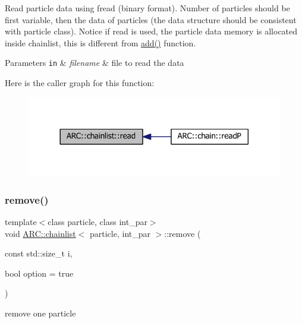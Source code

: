 Read particle data using fread (binary format). Number of particles should be first variable, then the data of particles (the data structure should be consistent with particle class). Notice if read is used, the particle data memory is allocated inside chainlist, this is different from \hyperlink{classARC_1_1chainlist_ab04a5742cd27168e0404e57a67d6afd1}{add()} function. 
\begin{DoxyParams}[1]{Parameters}
\mbox{\tt in}  & {\em filename} & file to read the data \\
\hline
\end{DoxyParams}
Here is the caller graph for this function\+:
\nopagebreak
\begin{figure}[H]
\begin{center}
\leavevmode
\includegraphics[width=317pt]{classARC_1_1chainlist_ad00d02518aa974cca1f82eec5d60afdd_icgraph}
\end{center}
\end{figure}
\hypertarget{classARC_1_1chainlist_a16edd790019b6aa7a7f6b5cc3e59a2c3}{}\label{classARC_1_1chainlist_a16edd790019b6aa7a7f6b5cc3e59a2c3} 
\subsubsection{\texorpdfstring{remove()}{remove()}}
{\footnotesize\ttfamily template$<$class particle, class int\+\_\+par$>$ \\
void \hyperlink{classARC_1_1chainlist}{A\+R\+C\+::chainlist}$<$ particle, int\+\_\+par $>$\+::remove (\begin{DoxyParamCaption}\item[{const std\+::size\+\_\+t}]{i,  }\item[{bool}]{option = {\ttfamily true} }\end{DoxyParamCaption})\hspace{0.3cm}{\ttfamily [inline]}}



remove one particle 

